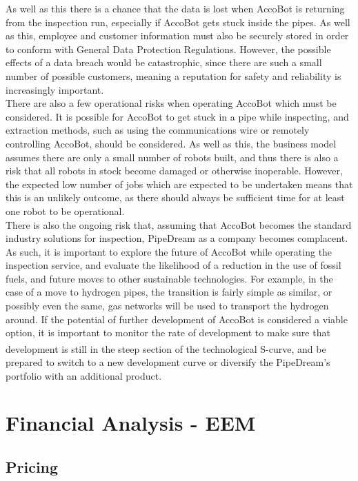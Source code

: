 \documentclass[11pt]{article}		%
\newcommand{\supercite}[1]{\textsuperscript{\cite{#1}}}		%
\begin{document}
     	As well as this there is a chance that the data is lost when AccoBot is returning from the inspection run, especially if AccoBot gets stuck inside the pipes.
     	As well as this, employee and customer information must also be securely stored in order to conform with General Data Protection Regulations.
     	However, the possible effects of a data breach would be catastrophic, since there are such a small number of possible customers, meaning a reputation for safety and reliability is increasingly important.
     	\\
     	There are also a few operational risks when operating AccoBot which must be considered.
     	It is possible for AccoBot to get stuck in a pipe while inspecting, and extraction methods, such as using the communications wire or remotely controlling AccoBot, should be considered.
     	As well as this, the business model assumes there are only a small number of robots built, and thus there is also a risk that all robots in stock become damaged or otherwise inoperable.
     	However, the expected low number of jobs which are expected to be undertaken means that this is an unlikely outcome, as there should always be sufficient time for at least one robot to be operational.
     	\\
     	There is also the ongoing risk that, assuming that AccoBot becomes the standard industry solutions for inspection, PipeDream as a company becomes complacent.
     	As such, it is important to explore the future of AccoBot while operating the inspection service, and evaluate the likelihood of a reduction in the use of fossil fuels, and future moves to other sustainable technologies.
     	For example, in the case of a move to hydrogen pipes, the transition is fairly simple as similar, or possibly even the same, gas networks will be used to transport the hydrogen around.
     	If the potential of further development of AccoBot is considered a viable option, it is important to monitor the rate of development to make sure that development is still in the steep section of the technological S-curve\supercite{christensen1998innovation}, and be prepared to switch to a new development curve or diversify the PipeDream's portfolio with an additional product.
     	
 	\section{Financial Analysis - EEM}
	 
	 
        \subsection{Pricing}
            
\end{document}

